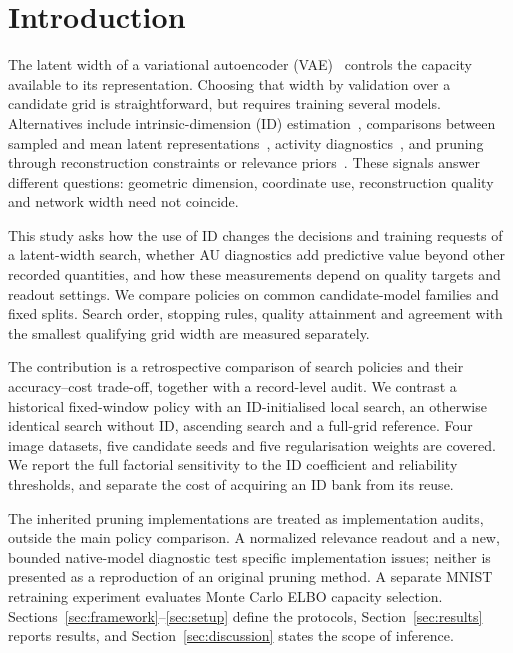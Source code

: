 \section{Introduction}\label{sec:intro}

The latent width of a variational autoencoder (VAE)~\cite{kingma2014vae}
controls the capacity available to its representation. Choosing that width
by validation over a candidate grid is straightforward, but requires
training several models. Alternatives include intrinsic-dimension (ID)
estimation~\cite{facco2017twonn,levina2005mle}, comparisons between sampled
and mean latent representations~\cite{bonheme2022fondue}, activity
diagnostics~\cite{burda2016iwae,bonheme2023active}, and pruning through
reconstruction constraints or relevance priors~\cite{deboom2020geco,saha2025ardvae}.
These signals answer different questions: geometric dimension, coordinate
use, reconstruction quality and network width need not coincide.

This study asks how the use of ID changes the decisions and training
requests of a latent-width search, whether AU diagnostics add predictive
value beyond other recorded quantities, and how these measurements depend
on quality targets and readout settings. We compare policies on common
candidate-model families and fixed splits. Search order, stopping rules,
quality attainment and agreement with the smallest qualifying grid width
are measured separately.

The contribution is a retrospective comparison of search policies and
their accuracy--cost trade-off, together with a record-level audit.
We contrast a historical fixed-window policy with an ID-initialised
local search, an otherwise identical search without ID, ascending search
and a full-grid reference. Four image datasets, five candidate seeds and
five regularisation weights are covered. We report the full factorial
sensitivity to the ID coefficient and reliability thresholds, and separate
the cost of acquiring an ID bank from its reuse.

The inherited pruning implementations are treated as implementation audits,
outside the main policy comparison. A normalized relevance readout and a
new, bounded native-model diagnostic test specific implementation issues;
neither is presented as a reproduction of an original pruning method.
A separate MNIST retraining experiment evaluates Monte Carlo ELBO capacity
selection. Sections~\ref{sec:framework}--\ref{sec:setup} define the protocols,
Section~\ref{sec:results} reports results, and
Section~\ref{sec:discussion} states the scope of inference.

